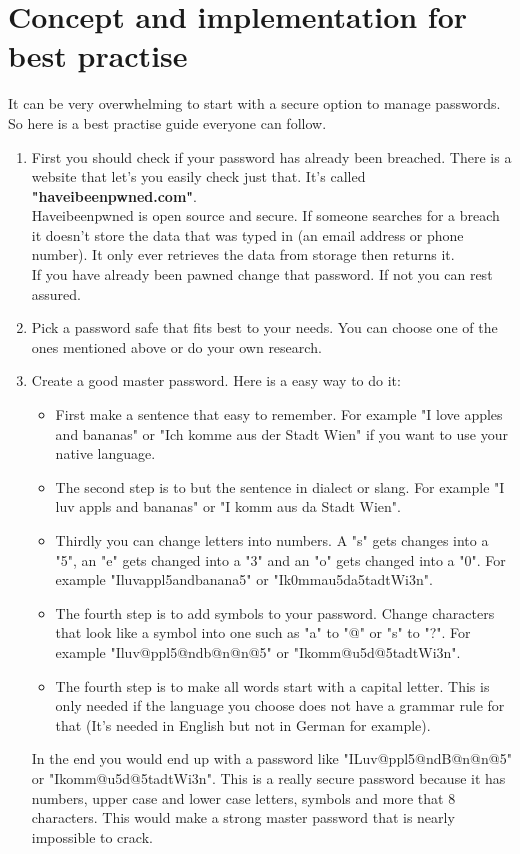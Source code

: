 \documentclass[conference]{IEEEtran}
\begin{document}
\section{Concept and implementation for best practise}
It can be very overwhelming to start with a secure option to manage passwords. So here is a best practise guide everyone can follow.
\begin{enumerate}
\item First you should check if your password has already been breached. There is a website that let's you easily check just that. It's called \textbf{"haveibeenpwned.com"}.\\
Haveibeenpwned is open source and secure. If someone searches for a breach it doesn't store the data that was typed in (an email address or phone number). It only ever retrieves the data from storage then returns it.\\
If you have already been pawned change that password. If not you can rest assured.
\item Pick a password safe that fits best to your needs. You can choose one of the ones mentioned above or do your own research.
\item Create a good master password. Here is a easy way to do it: 
\begin{itemize}
\item First make a sentence that easy to remember. For example "I love apples and bananas" or "Ich komme aus der Stadt Wien" if you want to use your native language.
\item The second step is to but the sentence in dialect or slang. For example "I luv appls and bananas" or "I komm aus da Stadt Wien".
\item Thirdly you can change letters into numbers. A "s" gets changes into a "5", an "e" gets changed into a "3" and an "o" gets changed into a "0". For example "Iluvappl5andbanana5" or "Ik0mmau5da5tadtWi3n".
\item The fourth step is to add symbols to your password. Change characters that look like a symbol into one such as "a" to "@" or "s" to "?". For example "Iluv@ppl5@ndb@n@n@5" or "Ikomm@u5d@5tadtWi3n".
\item The fourth step is to make all words start with a capital letter. This is only needed if the language you choose does not have a grammar rule for that (It's needed in English but not in German for example). 
\end{itemize}
In the end you would end up with a password like "ILuv@ppl5@ndB@n@n@5" or "Ikomm@u5d@5tadtWi3n". This is a really secure password because it has numbers, upper case and lower case letters, symbols and more that 8 characters. This would make a strong master password that is nearly impossible to crack.
\end{enumerate}
\end{document}
